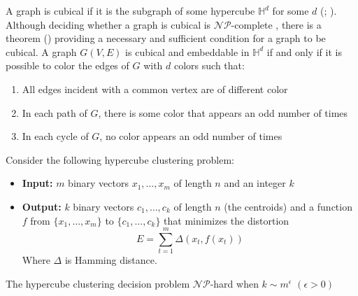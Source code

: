 A graph is cubical if it is the subgraph of some hypercube $\mathbb{H}^d$ for some $d$ (\citep{harary1988cubical}; \citep{livingston1988embeddings}). Although deciding whether a graph is cubical is $\mathcal{NP}$-complete \citep{afrati1985complexity}, there is a theorem (\citep{havel1972b}) providing a necessary and sufficient condition for a graph to be cubical. A graph $G(V,E)$ is cubical and embeddable in $\mathbb{H}^d$ if and only if it is possible to color the edges of $G$ with $d$ colors such that:
\begin{enumerate}
    \item All edges incident with a common vertex are of different color
    \item In each path of $G$, there is some color that appears an odd number of times
    \item In each cycle of $G$, no color appears an odd number of times
\end{enumerate} 
\begin{theorem}
    Consider the following hypercube clustering problem:
    \begin{itemize}
        \item \textbf{Input:} $m$ binary vectors $x_1, \dots, x_m$ of length $n$ and an integer $k$
        \item \textbf{Output:} $k$ binary vectors $c_1, \dots, c_k$ of length $n$ (the centroids) and a function $f$ from $\{x_1, \dots, x_m\}$ to $\{c_1, \dots, c_k\}$ that minimizes the distortion 
        \[
            E = \sum_{t=1}^m \Delta(x_t, f(x_t))    
        \]
        Where $\Delta$ is Hamming distance.
    \end{itemize}
    The hypercube clustering decision problem $\mathcal{NP}$-hard when $k \sim m^\epsilon$ $(\epsilon > 0)$
\end{theorem}
